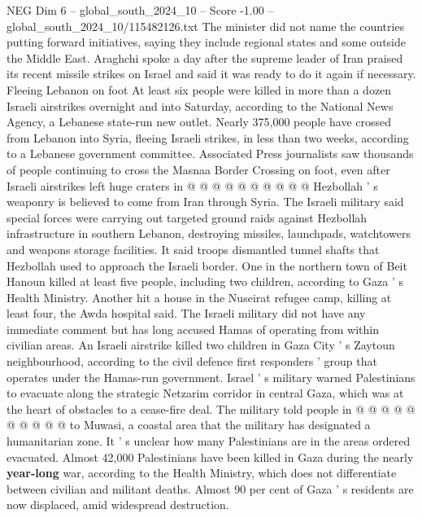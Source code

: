 \begin{textsample}{NEG Dim 6 – global\_south\_2024\_10 – Score -1.00 – global\_south\_2024\_10/115482126.txt}
The minister did not name the countries putting forward initiatives, saying they include regional states and some outside the Middle East.
Araghchi spoke a day after the supreme leader of Iran praised its recent missile strikes on Israel and said it was ready to do it again if necessary.
Fleeing Lebanon on foot At least six people were killed in more than a dozen Israeli airstrikes overnight and into Saturday, according to the National News Agency, a Lebanese state-run new outlet.
Nearly 375,000 people have crossed from Lebanon into Syria, fleeing Israeli strikes, in less than two weeks, according to a Lebanese government committee.
Associated Press journalists saw thousands of people continuing to cross the Masnaa Border Crossing on foot, even after Israeli airstrikes left huge craters in @ @ @ @ @ @ @ @ @ @ Hezbollah ' s weaponry is believed to come from Iran through Syria.
The Israeli military said special forces were carrying out targeted ground raids against Hezbollah infrastructure in southern Lebanon, destroying missiles, launchpads, watchtowers and weapons storage facilities.
It said troops dismantled tunnel shafts that Hezbollah used to approach the Israeli border.
One in the northern town of Beit Hanoun killed at least five people, including two children, according to Gaza ' s Health Ministry.
Another hit a house in the Nuseirat refugee camp, killing at least four, the Awda hospital said.
The Israeli military did not have any immediate comment but has long accused Hamas of operating from within civilian areas.
An Israeli airstrike killed two children in Gaza City ' s Zaytoun neighbourhood, according to the civil defence first responders ' group that operates under the Hamas-run government.
Israel ' s military warned Palestinians to evacuate along the strategic Netzarim corridor in central Gaza, which was at the heart of obstacles to a cease-fire deal.
The military told people in @ @ @ @ @ @ @ @ @ @ to Muwasi, a coastal area that the military has designated a humanitarian zone.
It ' s unclear how many Palestinians are in the areas ordered evacuated.
Almost 42,000 Palestinians have been killed in Gaza during the nearly \textbf{year-long} war, according to the Health Ministry, which does not differentiate between civilian and militant deaths.
Almost 90 per cent of Gaza ' s residents are now displaced, amid widespread destruction.

\end{textsample}
